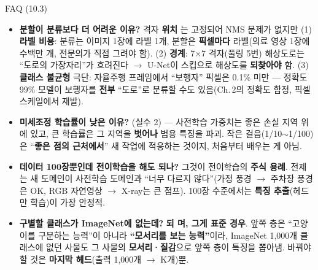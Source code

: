 \documentclass[aspectratio=169,11pt]{beamer}
\begin{document}
\begin{frame}{FAQ (10.3)}
  \small
  \begin{itemize}
    \item \textbf{분할이 분류보다 더 어려운 이유?} 격자 \textbf{위치}
      는 고정되어 NMS 문제가 없지만 (1) \textbf{라벨 비용}:
      분류는 이미지 1장에 라벨 1개, 분할은 \textbf{픽셀마다}
      라벨(의료 영상 1장에 수백만 개, 전문의가 직접 그려야 함).
      (2) \textbf{경계}: 7$\times$7 격자(풀링 5번) 해상도로는
      ``도로의 가장자리''가 흐려진다 $\to$ U-Net이 스킵으로
      해상도를 \textbf{되찾아야} 함. (3) \textbf{클래스
      불균형} 극단: 자율주행 프레임에서 ``보행자'' 픽셀은
      0.1\% 미만 --- 정확도 99\% 모델이 보행자를 \textbf{전부}
      ``도로''로 분류할 수도 있음(Ch.\,2의 정확도 함정,
      픽셀 스케일에서 재발).
    \item \textbf{미세조정 학습률이 낮은 이유?} (실수 2) ---
      사전학습 가중치는 좋은 손실 지역 위에 있고, 큰 학습률은
      그 지역을 \textbf{벗어나} 범용 특징을 파괴. 작은
      걸음(1/10$\sim$1/100)은 ``\textbf{좋은 점의 근처에서}''
      새 작업에 적응하는 것이지, 처음부터 배우는 게 아님.
    \item \textbf{데이터 100장뿐인데 전이학습을 해도 되나?}
      그것이 전이학습의 \textbf{주식 용례}. 전제는 새 도메인이
      사전학습 도메인과 ``너무 다르지 않다''(가정 풍경
      $\to$ 주차장 풍경은 OK, RGB 자연영상 $\to$ X-ray는
      큰 점프). 100장 수준에서는 \textbf{특징 추출}(헤드만
      학습)이 가장 안정적.
    \item \textbf{구별할 클래스가 ImageNet에 없는데?} \textbf{되
     며, 그게 표준 경우}. 앞쪽 층은 ``고양이를 구분하는
      능력''이 아니라 \textbf{``모서리를 보는 능력''}이라,
      ImageNet 1,000개 클래스에 없던 사물도 그 사물의
      \textbf{모서리·질감}으로 앞쪽 층이 특징을 뽑아냄.
      바꿔야 할 것은 \textbf{마지막 헤드}(출력 1,000개
      $\to$ K개)뿐.
  \end{itemize}
\end{frame}
\end{document}
